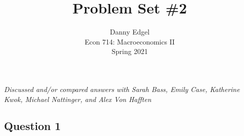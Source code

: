 \documentclass{article}
\begin{document}
\title{	Problem Set \#2 }
\author{ 	Danny Edgel 					\\ 
			Econ 714: Macroeconomics II		\\
			Spring 2021						\\
		}
\maketitle\thispagestyle{empty}


\noindent\textit{Discussed and/or compared answers with Sarah Bass, Emily Case, Katherine Kwok, Michael Nattinger, and Alex Von Hafften}


\subsection*{Question 1}
\end{document}
